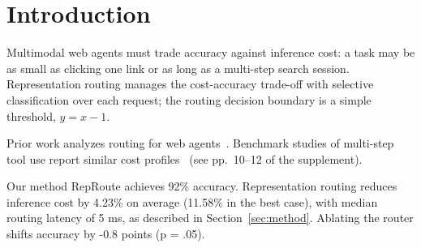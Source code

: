 \newcommand{\method}{RepRoute}

\section{Introduction}\label{sec:intro}

Multimodal web agents must trade accuracy against inference cost: a task may
be as small as clicking one link or as long as a multi-step search session.
Representation routing manages the cost-accuracy trade-off with selective
classification over each request; the routing decision boundary is a simple
threshold, $y = x - 1$.

Prior work analyzes routing for web agents~\cite{wang2025routing}.
Benchmark studies of multi-step tool use report similar cost
profiles~\cite{chen2024agents} (see pp.~10--12 of the supplement).

Our method \method{} achieves 92\% accuracy. Representation routing reduces
inference cost by 4.23\% on average (11.58\% in the best case), with median
routing latency of 5 ms, as described in Section~\ref{sec:method}. Ablating
the router shifts accuracy by -0.8 points (p = .05).
